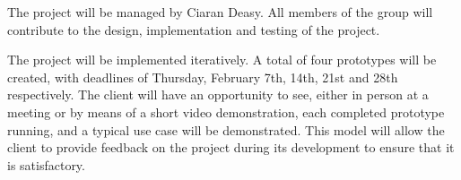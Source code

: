 \documentclass[]{report}
\begin{document}
The project will be managed by Ciaran Deasy. All members of the group will contribute to the design, implementation and testing of the project.

The project will be implemented iteratively. A total of four prototypes will be created, with deadlines of Thursday, February 7th, 14th, 21st and 28th respectively. The client will have an opportunity to see, either in person at a meeting or by means of a short video demonstration, each completed prototype running, and a typical use case will be demonstrated. This model will allow the client to provide feedback on the project during its development to ensure that it is satisfactory. 
\end{document}
